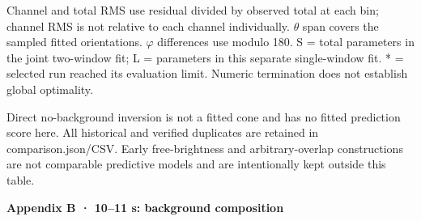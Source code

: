 \documentclass[10pt,a4paper]{article}
\newcommand{\heading}[1]{{\sffamily\Large\bfseries\color{ink}#1}\par\vspace{7pt}}
\begin{document}
Channel and total RMS use residual divided by observed total at each bin; channel RMS is not relative to each channel individually. \(θ\) span covers the sampled fitted orientations. \(φ\) differences use modulo 180\textdegree{}. S = total parameters in the joint two-window fit; L = parameters in this separate single-window fit. * = selected run reached its evaluation limit. Numeric termination does not establish global optimality.\par
Direct no-background inversion is not a fitted cone and has no fitted prediction score here. All historical and verified duplicates are retained in comparison.json/CSV. Early free-brightness and arbitrary-overlap constructions are not comparable predictive models and are intentionally kept outside this table.\par
\clearpage
\heading{Appendix B · 10–11 s: background composition}
\end{document}
